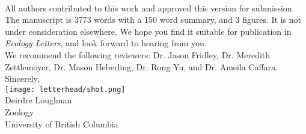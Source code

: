 \documentclass[11pt,a4paper]{article}
\begin{document}
\vspace{1.5ex}\\ 
\noindent All authors contributed to this work and approved this version for submission. The manuscript is 3773 words with a 150 word summary, and 3 figures. It is not under consideration elsewhere. We hope you find it suitable for publication in \emph{Ecology Letters}, and look forward to hearing from you. 
\vspace{1.5ex}\\
\noindent We recommend the following reviewers: Dr. Jason Fridley, Dr. Meredith Zettlemoyer, Dr. Mason Heberling, Dr. Rong Yu, and Dr. Ameila Caffara. 
\vspace{1.5ex}\\
\noindent Sincerely, \\
\texttt{[image: letterhead/shot.png]} \\
\noindent Deirdre Loughnan\\
\noindent Zoology\\
\noindent University of British Columbia

\newpage

\vspace{-5ex}
% 


\newpage
\end{document}
